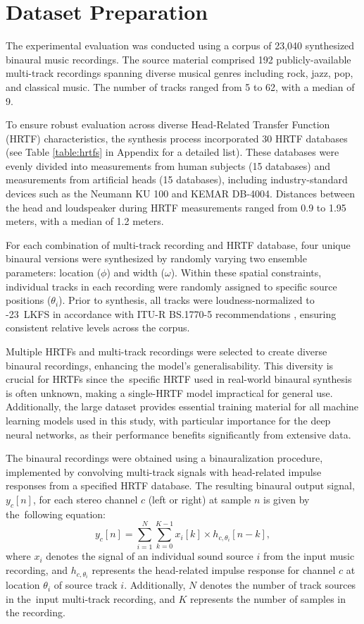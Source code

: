 \section{Dataset Preparation}

The experimental evaluation was conducted using a corpus of 23,040 synthesized binaural music recordings. The source material comprised 192 publicly-available multi-track recordings spanning diverse musical genres including rock, jazz, pop, and classical music. The number of tracks ranged from 5 to 62, with a median of 9.

To ensure robust evaluation across diverse Head-Related Transfer Function (HRTF) characteristics, the synthesis process incorporated 30 HRTF databases (see Table \ref{table:hrtfs} in Appendix for a detailed list). These databases were evenly divided into measurements from human subjects (15 databases) and measurements from artificial heads (15 databases), including industry-standard devices such as the Neumann KU 100 and KEMAR DB-4004. Distances between the head and loudspeaker during HRTF measurements ranged from 0.9 to 1.95 meters, with a median of 1.2 meters.

For each combination of multi-track recording and HRTF database, four unique binaural versions were synthesized by randomly varying two ensemble parameters: location ($\phi$) and width ($\omega$). Within these spatial constraints, individual tracks in each recording were randomly assigned to specific source positions ($\theta_i$). Prior to synthesis, all tracks were loudness-normalized to -23~LKFS in accordance with ITU-R BS.1770-5 recommendations \cite{noauthor_itu-r_2023}, ensuring consistent relative levels across the corpus.

Multiple HRTFs and multi-track recordings were selected to create diverse binaural recordings, enhancing the model's generalisability. This diversity is crucial for HRTFs since the~specific HRTF used in real-world binaural synthesis is often unknown, making a single-HRTF model impractical for general use. Additionally, the large dataset provides essential training material for all machine learning models used in this study, with particular importance for the deep neural networks, as their performance benefits significantly from extensive data.

The binaural recordings were obtained using a binauralization procedure, implemented by convolving multi-track signals with head-related impulse responses from a specified HRTF database. The resulting binaural output signal, $y_c[n]$, for each stereo channel $c$ (left or right) at sample $n$ is given by the~following equation:
\begin{equation} \label{eq:1}
    y_c[n] = \sum_{i=1}^{N} \sum_{k=0}^{K-1} x_i[k] \times h_{c,\theta_i}[n-k],
\end{equation}
where $x_i$ denotes the signal of an individual sound source $i$ from the input music recording, and  $h_{c,\theta_i}$ represents the head-related impulse response for channel $c$ at location $\theta_i$ of source track $i$. Additionally, $N$ denotes the number of track sources in the~input multi-track recording, and $K$ represents the number of samples in the recording.

